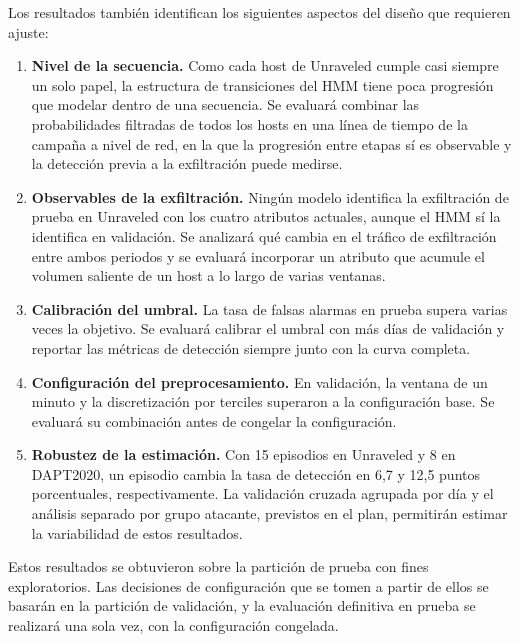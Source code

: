 Los resultados también identifican los siguientes aspectos del diseño que requieren ajuste:
\begin{enumerate}
    \item \textbf{Nivel de la secuencia.} Como cada host de Unraveled cumple casi siempre un solo papel, la estructura de transiciones del HMM tiene poca progresión que modelar dentro de una secuencia. Se evaluará combinar las probabilidades filtradas de todos los hosts en una línea de tiempo de la campaña a nivel de red, en la que la progresión entre etapas sí es observable y la detección previa a la exfiltración puede medirse.
    \item \textbf{Observables de la exfiltración.} Ningún modelo identifica la exfiltración de prueba en Unraveled con los cuatro atributos actuales, aunque el HMM sí la identifica en validación. Se analizará qué cambia en el tráfico de exfiltración entre ambos periodos y se evaluará incorporar un atributo que acumule el volumen saliente de un host a lo largo de varias ventanas.
    \item \textbf{Calibración del umbral.} La tasa de falsas alarmas en prueba supera varias veces la objetivo. Se evaluará calibrar el umbral con más días de validación y reportar las métricas de detección siempre junto con la curva completa.
    \item \textbf{Configuración del preprocesamiento.} En validación, la ventana de un minuto y la discretización por terciles superaron a la configuración base. Se evaluará su combinación antes de congelar la configuración.
    \item \textbf{Robustez de la estimación.} Con 15 episodios en Unraveled y 8 en DAPT2020, un episodio cambia la tasa de detección en 6,7 y 12,5 puntos porcentuales, respectivamente. La validación cruzada agrupada por día y el análisis separado por grupo atacante, previstos en el plan, permitirán estimar la variabilidad de estos resultados.
\end{enumerate}

Estos resultados se obtuvieron sobre la partición de prueba con fines exploratorios. Las decisiones de configuración que se tomen a partir de ellos se basarán en la partición de validación, y la evaluación definitiva en prueba se realizará una sola vez, con la configuración congelada.
